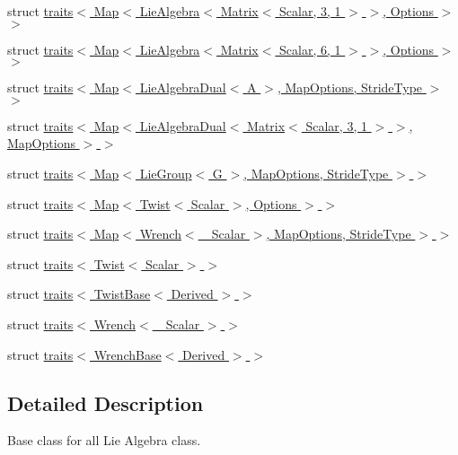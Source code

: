 \begin{DoxyCompactItemize}
\item 
struct \hyperlink{structinternal_1_1traits_3_01_map_3_01_lie_algebra_3_01_matrix_3_01_scalar_00_013_00_011_01_4_01_4_00_01_options_01_4_01_4}{traits$<$ Map$<$ Lie\+Algebra$<$ Matrix$<$ Scalar, 3, 1 $>$ $>$, Options $>$ $>$}
\item 
struct \hyperlink{structinternal_1_1traits_3_01_map_3_01_lie_algebra_3_01_matrix_3_01_scalar_00_016_00_011_01_4_01_4_00_01_options_01_4_01_4}{traits$<$ Map$<$ Lie\+Algebra$<$ Matrix$<$ Scalar, 6, 1 $>$ $>$, Options $>$ $>$}
\item 
struct \hyperlink{structinternal_1_1traits_3_01_map_3_01_lie_algebra_dual_3_01_a_01_4_00_01_map_options_00_01_stride_type_01_4_01_4}{traits$<$ Map$<$ Lie\+Algebra\+Dual$<$ A $>$, Map\+Options, Stride\+Type $>$ $>$}
\item 
struct \hyperlink{structinternal_1_1traits_3_01_map_3_01_lie_algebra_dual_3_01_matrix_3_01_scalar_00_013_00_011_01e8a24fa295b52ac8e6af43d3afd0f30d}{traits$<$ Map$<$ Lie\+Algebra\+Dual$<$ Matrix$<$ Scalar, 3, 1 $>$ $>$, Map\+Options $>$ $>$}
\item 
struct \hyperlink{structinternal_1_1traits_3_01_map_3_01_lie_group_3_01_g_01_4_00_01_map_options_00_01_stride_type_01_4_01_4}{traits$<$ Map$<$ Lie\+Group$<$ G $>$, Map\+Options, Stride\+Type $>$ $>$}
\item 
struct \hyperlink{structinternal_1_1traits_3_01_map_3_01_twist_3_01_scalar_01_4_00_01_options_01_4_01_4}{traits$<$ Map$<$ Twist$<$ Scalar $>$, Options $>$ $>$}
\item 
struct \hyperlink{structinternal_1_1traits_3_01_map_3_01_wrench_3_01___scalar_01_4_00_01_map_options_00_01_stride_type_01_4_01_4}{traits$<$ Map$<$ Wrench$<$ \+\_\+\+Scalar $>$, Map\+Options, Stride\+Type $>$ $>$}
\item 
struct \hyperlink{structinternal_1_1traits_3_01_twist_3_01_scalar_01_4_01_4}{traits$<$ Twist$<$ Scalar $>$ $>$}
\item 
struct \hyperlink{structinternal_1_1traits_3_01_twist_base_3_01_derived_01_4_01_4}{traits$<$ Twist\+Base$<$ Derived $>$ $>$}
\item 
struct \hyperlink{structinternal_1_1traits_3_01_wrench_3_01___scalar_01_4_01_4}{traits$<$ Wrench$<$ \+\_\+\+Scalar $>$ $>$}
\item 
struct \hyperlink{structinternal_1_1traits_3_01_wrench_base_3_01_derived_01_4_01_4}{traits$<$ Wrench\+Base$<$ Derived $>$ $>$}
\end{DoxyCompactItemize}


\subsection{Detailed Description}
Base class for all Lie Algebra class. 

